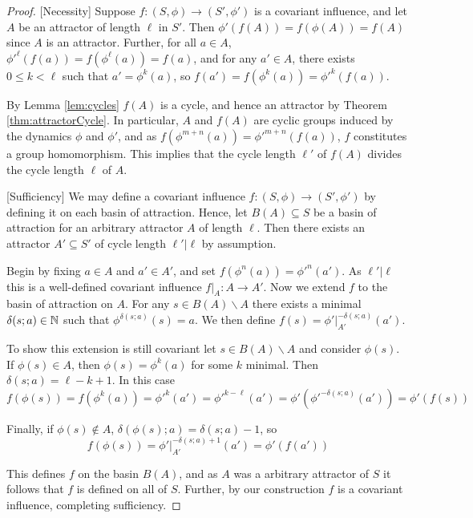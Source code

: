 \begin{proof}[Proof]
    [Necessity] Suppose $f:(S,\phi)\rightarrow (S',\phi')$ is a covariant influence, and let $A$ be an attractor of length $\ell$ in $S'$. Then $\phi'(f(A)) = f(\phi(A)) = f(A)$ since $A$ is an attractor. Further, for all $a \in A$, ${\phi'}^\ell(f(a)) = f(\phi^\ell(a)) = f(a)$, and for any $a' \in A$, there exists $0 \leq k < \ell$ such that $a' = \phi^k(a)$, so $f(a') = f(\phi^k(a)) = {\phi'}^k(f(a))$. 
    
    By Lemma \ref{lem:cycles} $f(A)$ is a cycle, and hence an attractor by Theorem \ref{thm:attractorCycle}. In particular, $A$ and $f(A)$ are cyclic groups induced by the dynamics $\phi$ and $\phi'$, and as $f(\phi^{m+n}(a)) = {\phi'}^{m+n}(f(a))$, $f$ constitutes a group homomorphism. This implies that the cycle length $\ell'$ of $f(A)$ divides the cycle length $\ell$ of $A$.

    \vspace{10pt}

    [Sufficiency] We may define a covariant influence $f:(S,\phi)\rightarrow (S',\phi')$ by defining it on each basin of attraction. Hence, let $B(A) \subseteq S$ be a basin of attraction for an arbitrary attractor $A$ of length $\ell$. Then there exists an attractor $A' \subseteq S'$ of cycle length $\ell'\vert \ell$ by assumption. 
    
    Begin by fixing $a \in A$ and $a' \in A'$, and set $f(\phi^n(a)) = {\phi'}^n(a')$. As $\ell'\vert \ell$ this is a well-defined covariant influence $f\vert_A:A\rightarrow A'$. Now we extend $f$ to the basin of attraction on $A$. For any $s \in B(A)\backslash A$ there exists a minimal $\delta(s;a) \in \mathbb N$ such that $\phi^{\delta(s;a)}(s) = a$. We then define $f(s) = \phi'\vert_{A'}^{-\delta(s;a)}(a')$.
    
    To show this extension is still covariant let $s \in B(A)\backslash A$ and consider $\phi(s)$. If $\phi(s) \in A$, then $\phi(s) = \phi^k(a)$ for some $k$ minimal. Then $\delta(s;a) = \ell-k+1$. In this case $$f(\phi(s)) = f(\phi^k(a)) = {\phi'}^k(a') = {\phi'}^{k-\ell}(a') = \phi'({\phi'}^{-\delta(s;a)}(a')) = \phi'(f(s))$$

    Finally, if $\phi(s) \notin A$, $\delta(\phi(s);a) = \delta(s;a)-1$, so $$f(\phi(s)) = \phi'\vert_{A'}^{-\delta(s;a)+1}(a') = \phi'(f(a'))$$

    This defines $f$ on the basin $B(A)$, and as $A$ was a arbitrary attractor of $S$ it follows that $f$ is defined on all of $S$. Further, by our construction $f$ is a covariant influence, completing sufficiency.
\end{proof}

